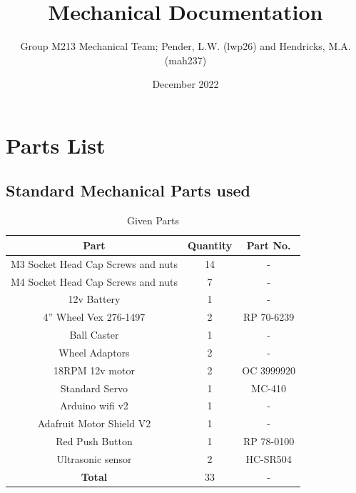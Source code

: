 \documentclass{article}
\title{Mechanical Documentation}
\author{Group M213 Mechanical Team; Pender, L.W. (lwp26) and Hendricks, M.A. (mah237)}
\date{December 2022}
\begin{document}
\maketitle

\newpage

\section{Parts List}

\subsection{Standard Mechanical Parts used}

\begin{table}[h]
    \centering
    \begin{tabular}{|c|c|c|}
        \hline
        \textbf{Part} & \textbf{Quantity} & \textbf{Part No.} \\ \hline
        \hline
        M3 Socket Head Cap Screws and nuts & 14 & -\\
        \hline
        M4 Socket Head Cap Screws and nuts & 7 & -\\
        \hline
        12v Battery & 1 & -\\ 
        \hline
        4” Wheel Vex 276-1497 & 2 & RP 70-6239\\
        \hline
        Ball Caster & 1 & -\\
        \hline
        Wheel Adaptors & 2 & -\\
        \hline
        18RPM 12v motor & 2 & OC 3999920\\
        \hline
        Standard Servo & 1 & MC-410 \\
        \hline
        Arduino wifi v2 & 1 & - \\
        \hline
        Adafruit Motor Shield V2 & 1 & - \\
        \hline
        Red Push Button & 1 & RP 78-0100\\
        \hline
        Ultrasonic sensor & 2 & HC-SR504\\
        \hline
        \textbf{Total} & 33 & -\\ \hline
    \end{tabular}
    \caption{Given Parts}
    \label{tab:given_parts}
\end{table}
\end{document}
